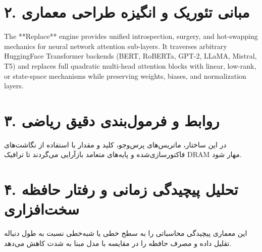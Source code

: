 \documentclass[12pt,a4paper]{article}
\begin{document}
\section*{۲. مبانی تئوریک و انگیزه طراحی معماری}
The **Replace** engine provides unified introspection, surgery, and hot-swapping mechanics for neural network attention sub-layers. It traverses arbitrary HuggingFace Transformer backends (BERT, RoBERTa, GPT-2, LLaMA, Mistral, T5) and replaces full quadratic multi-head attention blocks with linear, low-rank, or state-space mechanisms while preserving weights, biases, and normalization layers.

\section*{۳. روابط و فرمول‌بندی دقیق ریاضی}
در این ساختار، ماتریس‌های پرس‌وجو، کلید و مقدار با استفاده از نگاشت‌های فاکتورسازی‌شده و پایه‌های متعامد بازآرایی می‌گردند تا ترافیک DRAM مهار شود.

\section*{۴. تحلیل پیچیدگی زمانی و رفتار حافظه سخت‌افزاری}
این معماری پیچیدگی محاسباتی را به سطح خطی یا شبه‌خطی نسبت به طول دنباله تقلیل داده و مصرف حافظه را در مقایسه با مدل مبنا به شدت کاهش می‌دهد.
\end{document}
